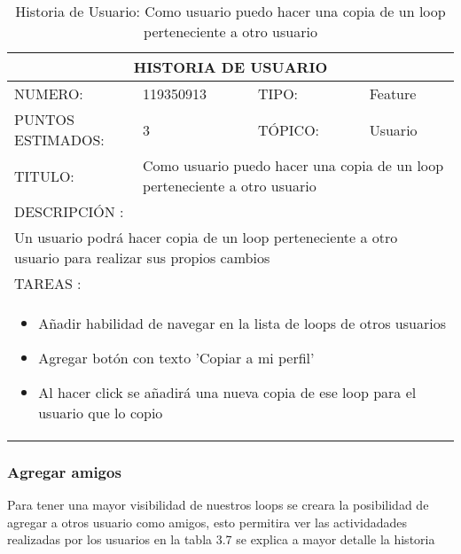 \begin{table}[h]
\centering
\renewcommand{\arraystretch}{1.4}
\begin{tabular}{|*{4}{l|}}
\hline
\multicolumn{4}{|c|}{HISTORIA DE USUARIO} \\ \hline
NUMERO: & 119350913 & TIPO: & Feature \\ \hline
PUNTOS ESTIMADOS: & 3 & TÓPICO: & Usuario \\ \hline
TITULO: & \multicolumn{3}{|p{7.2cm}|}{Como usuario puedo hacer una copia de un loop perteneciente a otro usuario} \\ \hline
\multicolumn{4}{|l|}{DESCRIPCIÓN : } \\ \hline
\multicolumn{4}{|p{11cm}|}{Un usuario podrá hacer copia de un loop perteneciente a otro usuario para realizar sus propios cambios} \\ \hline
\multicolumn{4}{|l|}{TAREAS : } \\ \hline
\multicolumn{4}{|p{11cm}|}{
\begin{minipage}[t]{\hsize}
  \begin{itemize}
    \item Añadir habilidad de navegar en la lista de loops de otros usuarios
    \item Agregar botón con texto 'Copiar a mi perfil'
    \item Al hacer click se añadirá una nueva copia de ese loop para el usuario que lo copio
  \end{itemize}
\end{minipage}
} \\ \hline
\end{tabular}
\caption{Historia de Usuario: Como usuario puedo hacer una copia de un loop perteneciente a otro usuario}
\label{tab:Primero}
\end{table}

\subsubsection{Agregar amigos}

Para tener una mayor visibilidad de nuestros loops se creara la posibilidad
de agregar a otros usuario como amigos, esto permitira ver las actividadades
realizadas por los usuarios en la tabla 3.7 se explica a mayor detalle la
historia

